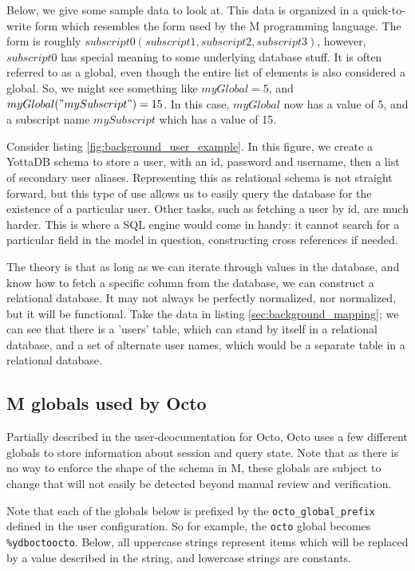 \documentclass[]{article}
\def\code#1{\texttt{#1}}
\begin{document}
Below, we give some sample data to look at.
This data is organized in a quick-to-write form which resembles the form used by the M programming language.
The form is roughly $subscript0(subscript1,subscript2,subscript3)$, however, $subscript0$ has special meaning to some underlying database stuff.
It is often referred to as a global, even though the entire list of elements is also considered a global.
So, we might see something like $myGlobal=5$, and $myGlobal("mySubscript")=15$.
In this case, $myGlobal$ now has a value of 5, and a subscript name $mySubscript$ which has a value of 15.

Consider listing \ref{fig:background_user_example}.
In this figure, we create a YottaDB schema to store a user, with an id, password and username, then a list of secondary user aliases.
Representing this as relational schema is not straight forward, but this type of use allows us to easily query the database for the existence of a particular user.
Other tasks, such as fetching a user by id, are much harder.
This is where a SQL engine would come in handy: it cannot search for a particular field in the model in question, constructing cross references if needed.



The theory is that as long as we can iterate through values in the database, and know how to fetch a specific column from the database, we can construct a relational database.
It may not always be perfectly normalized, nor normalized, but it will be functional.
Take the data in listing \ref{sec:background_mapping}; we can see that there is a 'users' table, which can stand by itself in a relational database, and a set of alternate user names, which would be a separate table in a relational database.

\subsection{M globals used by Octo}

Partially described in the user-deocumentation for Octo, Octo uses a few different globals to store information about session and query state.
Note that as there is no way to enforce the shape of the schema in M, these globals are subject to change that will not easily be detected beyond manual review and verification.

Note that each of the globals below is prefixed by the \code{octo\_global\_prefix} defined in the user configuration.
So for example, the \code{octo} global becomes \code{\%ydboctoocto}.
Below, all uppercase strings represent items which will be replaced by a value described in the string, and lowercase strings are constants.
\end{document}
